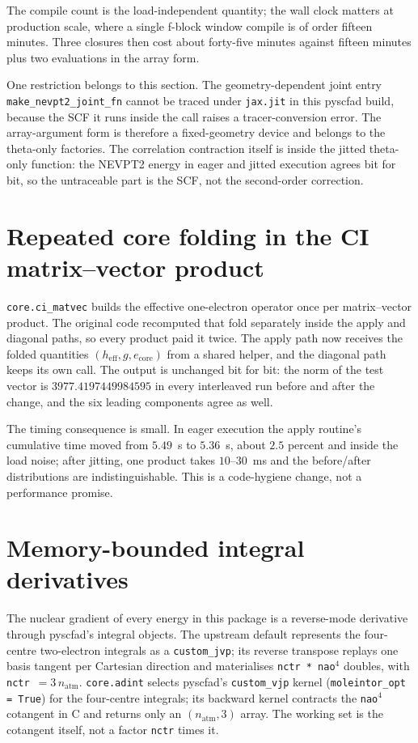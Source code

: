 The compile count is the load-independent quantity; the wall clock
matters at production scale, where a single f-block window compile is
of order fifteen minutes.  Three closures then cost about forty-five
minutes against fifteen minutes plus two evaluations in the array
form.

One restriction belongs to this section.  The geometry-dependent joint
entry \texttt{make\_nevpt2\_\allowbreak joint\_fn} cannot be traced under
\texttt{jax.jit} in this pyscfad build, because the SCF it runs inside
the call raises a tracer-conversion error.  The array-argument form is
therefore a fixed-geometry device and belongs to the theta-only
factories.  The correlation contraction itself is inside the jitted
theta-only function: the NEVPT2 energy in eager and jitted execution
agrees bit for bit, so the untraceable part is the SCF, not the
second-order correction.

\section{Repeated core folding in the CI matrix--vector product}

\texttt{core.ci\_matvec} builds the effective one-electron operator
once per matrix--vector product.  The original code recomputed that
fold separately inside the apply and diagonal paths, so every product
paid it twice.  The apply path now receives the folded quantities
$(h_{\mathrm{eff}}, g, e_{\mathrm{core}})$ from a shared helper, and
the diagonal path keeps its own call.  The output is unchanged bit for
bit: the norm of the test vector is $3977.4197449984595$ in every
interleaved run before and after the change, and the six leading
components agree as well.

The timing consequence is small.  In eager execution the apply
routine's cumulative time moved from $5.49$~s to $5.36$~s, about
$2.5$ percent and inside the load noise; after jitting, one product
takes $10$--$30$~ms and the before/after distributions are
indistinguishable.  This is a code-hygiene change, not a performance
promise.

\section{Memory-bounded integral derivatives}
\label{sec:adint}

The nuclear gradient of every energy in this package is a reverse-mode
derivative through pyscfad's integral objects.  The upstream default
represents the four-centre two-electron integrals as a
\texttt{custom\_jvp}; its reverse transpose replays one basis tangent
per Cartesian direction and materialises \texttt{nctr * nao}$^4$
doubles, with \texttt{nctr}~$=3\,n_\mathrm{atm}$.  \texttt{core.adint}
selects pyscfad's \texttt{custom\_vjp} kernel
(\texttt{moleintor\_opt = True}) for the four-centre integrals; its
backward kernel contracts the \texttt{nao}$^4$ cotangent in C and
returns only an $(n_\mathrm{atm},3)$ array.  The working set is the
cotangent itself, not a factor \texttt{nctr} times it.

